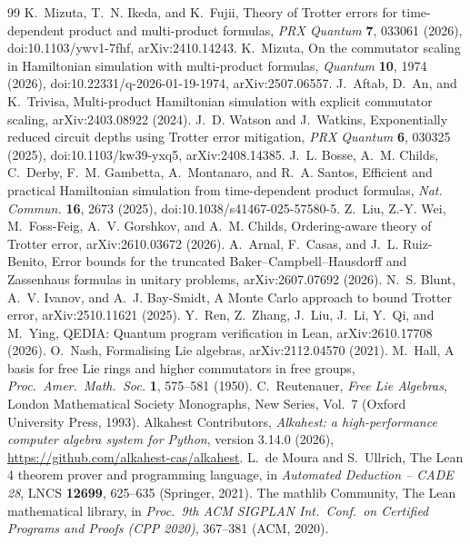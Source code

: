\documentclass[11pt]{article}
\theoremstyle{plain}
\theoremstyle{definition}
\theoremstyle{remark}
\begin{document}
\begin{thebibliography}{99}
 K.~Mizuta, T.~N. Ikeda, and K.~Fujii, Theory of Trotter errors for time-dependent product and multi-product formulas, \emph{PRX Quantum} \textbf{7}, 033061 (2026), doi:10.1103/ywv1-7fhf, arXiv:2410.14243.
 K.~Mizuta, On the commutator scaling in Hamiltonian simulation with multi-product formulas, \emph{Quantum} \textbf{10}, 1974 (2026), doi:10.22331/q-2026-01-19-1974, arXiv:2507.06557.
 J.~Aftab, D.~An, and K.~Trivisa, Multi-product Hamiltonian simulation with explicit commutator scaling, arXiv:2403.08922 (2024).
 J.~D. Watson and J.~Watkins, Exponentially reduced circuit depths using Trotter error mitigation, \emph{PRX Quantum} \textbf{6}, 030325 (2025), doi:10.1103/kw39-yxq5, arXiv:2408.14385.
 J.~L. Bosse, A.~M. Childs, C.~Derby, F.~M. Gambetta, A.~Montanaro, and R.~A. Santos, Efficient and practical Hamiltonian simulation from time-dependent product formulas, \emph{Nat. Commun.} \textbf{16}, 2673 (2025), doi:10.1038/s41467-025-57580-5.
 Z.~Liu, Z.-Y. Wei, M.~Foss-Feig, A.~V. Gorshkov, and A.~M. Childs, Ordering-aware theory of Trotter error, arXiv:2610.03672 (2026).
 A.~Arnal, F.~Casas, and J.~L. Ruiz-Benito, Error bounds for the truncated Baker--Campbell--Hausdorff and Zassenhaus formulas in unitary problems, arXiv:2607.07692 (2026).
 N.~S. Blunt, A.~V. Ivanov, and A.~J. Bay-Smidt, A Monte Carlo approach to bound Trotter error, arXiv:2510.11621 (2025).
 Y.~Ren, Z.~Zhang, J.~Liu, J.~Li, Y.~Qi, and M.~Ying, QEDIA: Quantum program verification in Lean, arXiv:2610.17708 (2026).
 O.~Nash, Formalising Lie algebras, arXiv:2112.04570 (2021).
 M.~Hall, A basis for free Lie rings and higher commutators in free groups,
\emph{Proc.\ Amer.\ Math.\ Soc.} \textbf{1}, 575--581 (1950).
 C.~Reutenauer, \emph{Free Lie Algebras}, London Mathematical Society Monographs,
New Series, Vol.~7 (Oxford University Press, 1993).
 Alkahest Contributors, \emph{Alkahest: a high-performance computer algebra system for
Python}, version 3.14.0 (2026), \url{https://github.com/alkahest-cas/alkahest}.
 L.~de Moura and S.~Ullrich, The Lean 4 theorem prover and programming language, in
\emph{Automated Deduction -- CADE 28}, LNCS \textbf{12699}, 625--635 (Springer, 2021).
 The mathlib Community, The Lean mathematical library, in \emph{Proc.\ 9th ACM SIGPLAN
Int.\ Conf.\ on Certified Programs and Proofs (CPP 2020)}, 367--381 (ACM, 2020).
\end{thebibliography}
\end{document}
